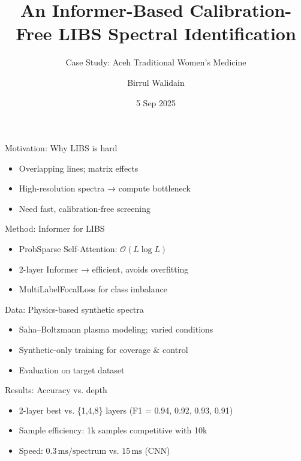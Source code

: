 \documentclass{beamer}
\title[Calibration-Free LIBS w/ Informer]{An Informer-Based Calibration-Free LIBS Spectral Identification}
\subtitle{Case Study: Aceh Traditional Women's Medicine}
\author[Walidain]{Birrul Walidain}
\date{5 Sep 2025}
\begin{document}
\maketitle %

\begin{frame}{Motivation: Why LIBS is hard}
  \begin{itemize}
    \item Overlapping lines; matrix effects
    \item High-resolution spectra → compute bottleneck
    \item Need fast, calibration-free screening
  \end{itemize}
  \vspace{4pt}
\end{frame}

\begin{frame}{Method: Informer for LIBS}
  \begin{itemize}
    \item ProbSparse Self-Attention: \(\mathcal O(L\log L)\)
    \item 2-layer Informer → efficient, avoids overfitting
    \item MultiLabelFocalLoss for class imbalance
  \end{itemize}
  \vspace{4pt}
\end{frame}

\begin{frame}{Data: Physics-based synthetic spectra}
  \begin{itemize}
    \item Saha–Boltzmann plasma modeling; varied conditions
    \item Synthetic-only training for coverage \& control
    \item Evaluation on target dataset
  \end{itemize}
  \vspace{4pt}
\end{frame}

\begin{frame}{Results: Accuracy vs. depth}
  \begin{itemize}
    \item 2-layer best vs. \{1,4,8\} layers (F1 = 0.94, 0.92, 0.93, 0.91)
    \item Sample efficiency: 1k samples competitive with 10k
    \item Speed: \(0.3\,\text{ms}/\text{spectrum}\) vs. \(15\,\text{ms}\) (CNN)
  \end{itemize}
  \vspace{4pt}
\end{frame}
\end{document}

